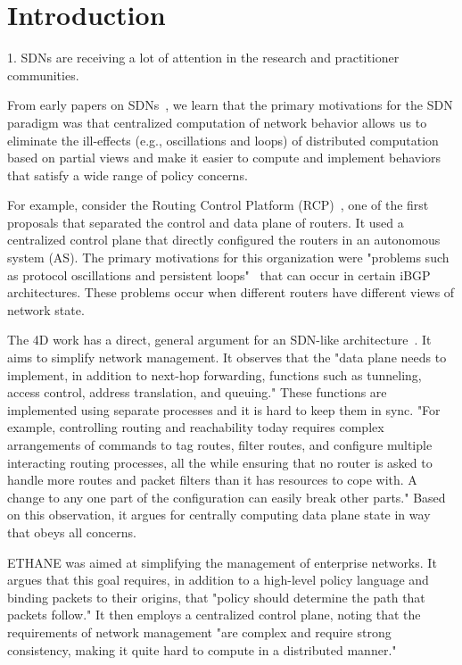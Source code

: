 \section{Introduction}
\label{sec:intro}

1.	SDNs are receiving a lot of attention in the research and practitioner communities.

From early papers on SDNs~\cite{rcp-case,rcp,4d,ethane}, we learn that the primary motivations for the SDN paradigm was that centralized computation of network behavior allows us to eliminate the ill-effects (e.g., oscillations and loops) of distributed computation based on partial views and make it easier to compute and implement behaviors that satisfy a wide range of policy concerns.

For example, consider the Routing Control Platform (RCP)~\cite{rcp-case,rcp}, one of the first proposals that separated the control and data plane of routers. It used a centralized control plane that directly configured the routers in an autonomous system (AS). The primary motivations for this organization were "problems such as protocol oscillations and persistent loops"~\cite{rcp} that can occur in certain iBGP architectures. These problems occur when different routers have different views of network state.

The 4D work has a direct, general argument for an SDN-like architecture~\cite{4d}. It aims to simplify network management. It observes that the "data plane needs to implement, in addition to next-hop forwarding, functions such as tunneling, access control, address translation, and queuing." These functions are implemented using separate processes and it is hard to keep them in sync. "For example, controlling routing and reachability today requires complex arrangements of commands to tag routes, filter routes, and configure multiple interacting routing processes, all the while ensuring that no router is asked to handle more routes and packet filters than it has resources to cope with. A change to any one part of the configuration can easily break other parts." Based on this observation, it argues for centrally computing data plane state in way that obeys all concerns.

ETHANE was aimed at simplifying the management of enterprise networks. It argues that this goal requires, in addition to a high-level policy language and binding packets to their origins, that "policy should determine the path that packets follow." It then employs a centralized control plane, noting that the requirements of network management "are complex and require strong consistency, making it quite hard to compute in a distributed manner."

